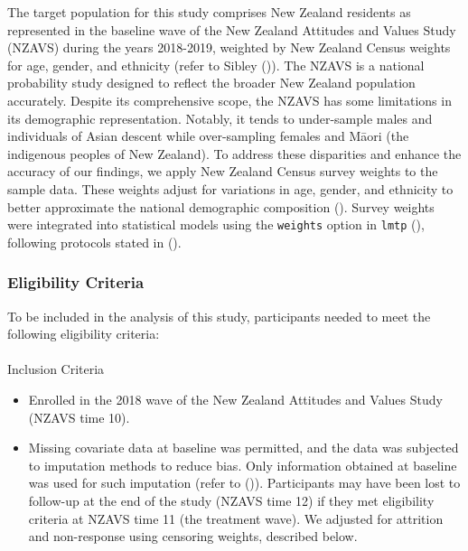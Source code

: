 \documentclass[
  single column]{article}
\makeatletter
\let\oldparagraph\paragraph
\renewcommand{\paragraph}{
    \@ifstar
      \xxxParagraphStar
      \xxxParagraphNoStar
  }
\newcommand{\xxxParagraphStar}[1]{\oldparagraph*{#1}\mbox{}}
\newcommand{\xxxParagraphNoStar}[1]{\oldparagraph{#1}\mbox{}}
\providecommand{\tightlist}{%
  \setlength{\itemsep}{0pt}\setlength{\parskip}{0pt}}\usepackage{longtable,booktabs,array}
\makeatother
\begin{document}
The target population for this study comprises New Zealand residents as
represented in the baseline wave of the New Zealand Attitudes and Values
Study (NZAVS) during the years 2018-2019, weighted by New Zealand Census
weights for age, gender, and ethnicity (refer to Sibley
()). The NZAVS is a national probability
study designed to reflect the broader New Zealand population accurately.
Despite its comprehensive scope, the NZAVS has some limitations in its
demographic representation. Notably, it tends to under-sample males and
individuals of Asian descent while over-sampling females and Māori (the
indigenous peoples of New Zealand). To address these disparities and
enhance the accuracy of our findings, we apply New Zealand Census survey
weights to the sample data. These weights adjust for variations in age,
gender, and ethnicity to better approximate the national demographic
composition (). Survey weights
were integrated into statistical models using the \texttt{weights}
option in \texttt{lmtp} (), following protocols stated in
().

\subsubsection{Eligibility Criteria}\label{eligibility-criteria}

To be included in the analysis of this study, participants needed to
meet the following eligibility criteria:

\paragraph{Inclusion Criteria}\label{inclusion-criteria}

\begin{itemize}
\tightlist
\item
  Enrolled in the 2018 wave of the New Zealand Attitudes and Values
  Study (NZAVS time 10).
\item
  Missing covariate data at baseline was permitted, and the data was
  subjected to imputation methods to reduce bias. Only information
  obtained at baseline was used for such imputation (refer to
  ()). Participants may have been lost to follow-up at the end of
  the study (NZAVS time 12) if they met eligibility criteria at NZAVS
  time 11 (the treatment wave). We adjusted for attrition and
  non-response using censoring weights, described below.
\end{itemize}
\end{document}
